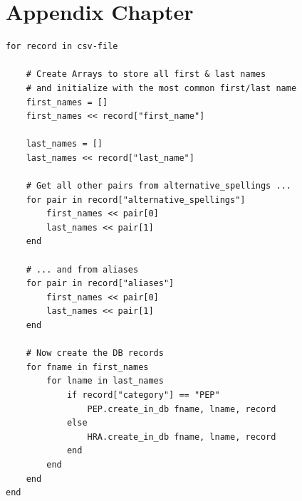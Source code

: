 \documentclass[a4paper, oneside]{csthesis}
\begin{document}




\appendix
\chapter{Appendix Chapter}

\begin{lstlisting}[caption={The Algorithm that parses the csv file creates a separate DB record for each first/last name pair},label={lst:world-check-parse}]
for record in csv-file

    # Create Arrays to store all first & last names
    # and initialize with the most common first/last name
    first_names = []
    first_names << record["first_name"]

    last_names = []
    last_names << record["last_name"]

    # Get all other pairs from alternative_spellings ...
    for pair in record["alternative_spellings"]
        first_names << pair[0]
        last_names << pair[1]
    end

    # ... and from aliases
    for pair in record["aliases"]
        first_names << pair[0]
        last_names << pair[1]
    end

    # Now create the DB records
    for fname in first_names
        for lname in last_names
            if record["category"] == "PEP"
                PEP.create_in_db fname, lname, record
            else
                HRA.create_in_db fname, lname, record
            end
        end
    end
end
\end{lstlisting}
\end{document}
